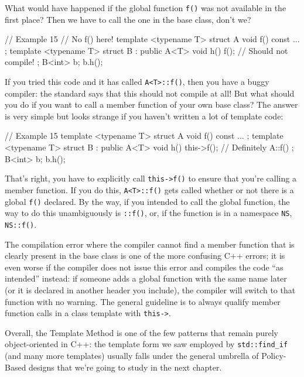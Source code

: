 What would have happened if the global function \texttt{f()} was not available in the first place? Then we have to call the one in the base class, don't we?

\begin{code}
// Example 15
// No f() here!
template <typename T> struct A {
  void f() const { ... }
};
template <typename T> struct B : public A<T> {
  void h() { f(); } // Should not compile!
};
B<int> b;
b.h();
\end{code}

If you tried this code and it has called \texttt{A\textless{}T\textgreater{}::f()}, then you have a buggy compiler: the standard says that this should not compile at all! But what should you do if you want to call a member function of your own base class? The answer is very simple but looks strange if you haven't written a lot of template code:

\begin{code}
// Example 15
template <typename T> struct A {
  void f() const { ... }
};
template <typename T> struct B : public A<T> {
  void h() { this->f(); } // Definitely A::f()
};
B<int> b;
b.h();
\end{code}

That's right, you have to explicitly call \texttt{this-\textgreater{}f()} to ensure that you're calling a member function. If you do this, \texttt{A\textless{}T\textgreater{}::f()} gets called whether or not there is a global \texttt{f()} declared. By the way, if you intended to call the global function, the way to do this unambiguously is \texttt{::f()}, or, if the function is in a namespace \texttt{NS}, \texttt{NS::f()}.

The compilation error where the compiler cannot find a member function that is clearly present in the base class is one of the more confusing C++ errors; it is even worse if the compiler does not issue this error and compiles the code ``as intended'' instead: if someone adds a global function with the same name later (or it is declared in another header you include), the compiler will switch to that function with no warning. The general guideline is to always qualify member function calls in a class template with \texttt{this-\textgreater{}}.

Overall, the Template Method is one of the few patterns that remain purely object-oriented in C++: the template form we saw employed by \texttt{std::find\_if} (and many more templates) usually falls under the general umbrella of Policy-Based designs that we're going to study in the next chapter.


